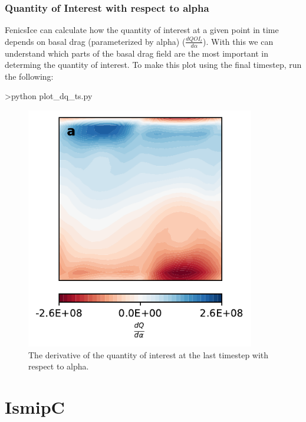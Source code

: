 \documentclass[11pt, reqno, nocenter]{article}
\begin{document}
\subsubsection{Quantity of Interest with respect to alpha}

FenicsIce can calculate how the quantity of interest at a given point in time depends on basal drag (parameterized by alpha) ($\frac{d QOI_{t}}{d \alpha}$). With this we can understand which parts of the basal drag field are the most important in determing the quantity of interest. To make this plot using the final timestep, run the following:

\begin{spverbatim}
>python plot_dq_ts.py
\end{spverbatim}

\begin{figure}[!htbp]
  \centering
  \includegraphics[width=10cm]{./figures/dq_ts.pdf}
  \caption[Derivative of Quantity of Interest at last timestep w.r.t to alpha]{The derivative of the quantity of interest at the last timestep with respect to alpha. }
      \label{fig:grid_convergence}
\end{figure}





\section{IsmipC}\label{IsmipC}
\end{document}
